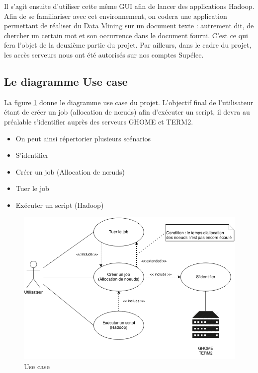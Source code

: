 \par Il s’agit ensuite d’utiliser cette même GUI afin de lancer des applications Hadoop. Afin de se familiariser avec cet environnement, on codera une application permettant de réaliser du Data Mining sur un document texte : autrement dit, de chercher un certain mot et son occurrence dans le document fourni. C’est ce qui fera l’objet de la deuxième partie du projet.
Par ailleurs, dans le cadre du projet, les accès serveurs nous ont été autorisés sur nos comptes Supélec.

\subsection{Le diagramme Use case}
\label{sec:le-diagramme-use}

La figure \ref{fig:use_case} donne le diagramme use case du projet. L’objectif final de l’utilisateur étant de créer un job (allocation de nœuds) afin d’exécuter un script, il devra au préalable s’identifier auprès des serveurs GHOME et TERM2.
\begin{itemize}
\item On peut ainsi répertorier plusieurs scénarios
\item S’identifier
\item Créer un job (Allocation de nœuds)
\item Tuer le job
\item Exécuter un script (Hadoop)
\end{itemize}

\begin{figure}[h!]
  \centering
  \includegraphics[width=14cm]{images/use_case.png}
  \caption{Use case}
  \label{fig:use_case}
\end{figure}


